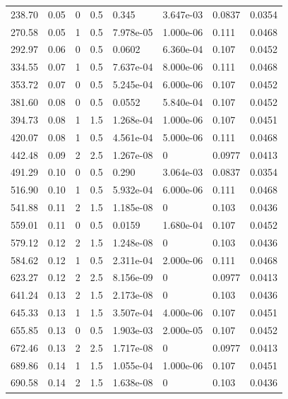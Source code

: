 \documentclass[preview]{standalone}
\begin{document}
{{\begin{tabular}{L{1.2cm}C{1.2cm} C{0.3cm}C{0.5cm} C{1.4cm}C{1.4cm} C{1.4cm}C{1.4cm}}
  238.70  &  0.05  & 0     & 0.5 &  0.345  & 3.647e-03  & 0.0837 &  0.0354   \\ 
  270.58  &  0.05  & 1     & 0.5 &  7.978e-05  & 1.000e-06  & 0.111 &  0.0468   \\ 
  292.97  &  0.06  & 0     & 0.5 &  0.0602  & 6.360e-04  & 0.107 &  0.0452   \\ 
  334.55  &  0.07  & 1     & 0.5 &  7.637e-04  & 8.000e-06  & 0.111 &  0.0468   \\ 
  353.72  &  0.07  & 0     & 0.5 &  5.245e-04  & 6.000e-06  & 0.107 &  0.0452   \\ 
  381.60  &  0.08  & 0     & 0.5 &  0.0552  & 5.840e-04  & 0.107 &  0.0452   \\ 
  394.73  &  0.08  & 1     & 1.5 &  1.268e-04  & 1.000e-06  & 0.107 &  0.0451   \\ 
  420.07  &  0.08  & 1     & 0.5 &  4.561e-04  & 5.000e-06  & 0.111 &  0.0468   \\ 
  442.48  &  0.09  & 2     & 2.5 &  1.267e-08  & 0  & 0.0977 &  0.0413   \\ 
  491.29  &  0.10  & 0     & 0.5 &  0.290  & 3.064e-03  & 0.0837 &  0.0354   \\ 
  516.90  &  0.10  & 1     & 0.5 &  5.932e-04  & 6.000e-06  & 0.111 &  0.0468   \\ 
  541.88  &  0.11  & 2     & 1.5 &  1.185e-08  & 0  & 0.103 &  0.0436   \\ 
  559.01  &  0.11  & 0     & 0.5 &  0.0159  & 1.680e-04  & 0.107 &  0.0452   \\ 
  579.12  &  0.12  & 2     & 1.5 &  1.248e-08  & 0  & 0.103 &  0.0436   \\ 
  584.62  &  0.12  & 1     & 0.5 &  2.311e-04  & 2.000e-06  & 0.111 &  0.0468   \\ 
  623.27  &  0.12  & 2     & 2.5 &  8.156e-09  & 0  & 0.0977 &  0.0413   \\ 
  641.24  &  0.13  & 2     & 1.5 &  2.173e-08  & 0  & 0.103 &  0.0436   \\ 
  645.33  &  0.13  & 1     & 1.5 &  3.507e-04  & 4.000e-06  & 0.107 &  0.0451   \\ 
  655.85  &  0.13  & 0     & 0.5 &  1.903e-03  & 2.000e-05  & 0.107 &  0.0452   \\ 
  672.46  &  0.13  & 2     & 2.5 &  1.717e-08  & 0  & 0.0977 &  0.0413   \\ 
  689.86  &  0.14  & 1     & 1.5 &  1.055e-04  & 1.000e-06  & 0.107 &  0.0451   \\ 
  690.58  &  0.14  & 2     & 1.5 &  1.638e-08  & 0  & 0.103 &  0.0436   \\ 

\end{tabular}}}
\end{document}
